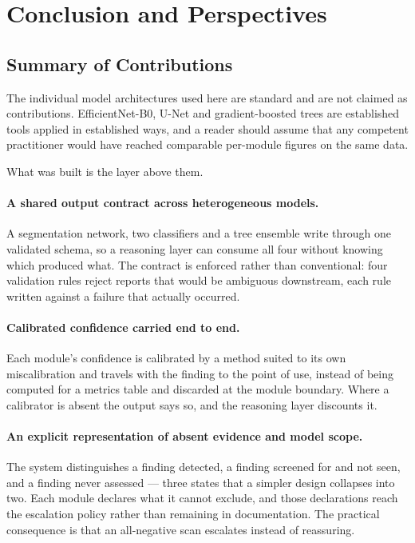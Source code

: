 \section{Conclusion and Perspectives}
\label{sec:conclusion}

\subsection{Summary of Contributions}
\label{subsec:conclusion-contributions}

The individual model architectures used here are standard and are not claimed as
contributions. EfficientNet-B0, U-Net and gradient-boosted trees are established tools applied
in established ways, and a reader should assume that any competent practitioner would have
reached comparable per-module figures on the same data.

What was built is the layer above them.

\paragraph{A shared output contract across heterogeneous models.} A segmentation network, two
classifiers and a tree ensemble write through one validated schema, so a reasoning layer can
consume all four without knowing which produced what. The contract is enforced rather than
conventional: four validation rules reject reports that would be ambiguous downstream, each rule
written against a failure that actually occurred.

\paragraph{Calibrated confidence carried end to end.} Each module's confidence is calibrated by
a method suited to its own miscalibration and travels with the finding to the point of use,
instead of being computed for a metrics table and discarded at the module boundary. Where a
calibrator is absent the output says so, and the reasoning layer discounts it.

\paragraph{An explicit representation of absent evidence and model scope.} The system
distinguishes a finding detected, a finding screened for and not seen, and a finding never
assessed --- three states that a simpler design collapses into two. Each module declares what it
cannot exclude, and those declarations reach the escalation policy rather than remaining in
documentation. The practical consequence is that an all-negative scan escalates instead of
reassuring.

